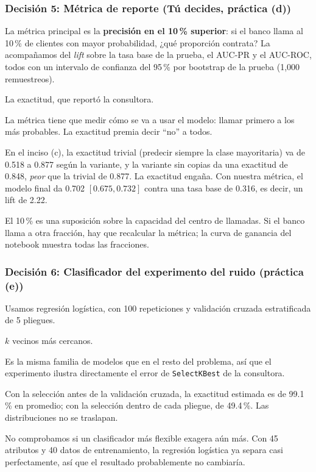 \documentclass[11pt, letterpaper]{article}
\begin{document}
\subsubsection*{Decisión 5: Métrica de reporte (Tú decides, práctica (d))}
\begin{description}[leftmargin=0pt, itemsep=2pt]
    \item[Decisión.] La métrica principal es la \textbf{precisión en el 10\,\% superior}: si el banco llama al 10\,\% de clientes con mayor probabilidad, ¿qué proporción contrata? La acompañamos del \emph{lift} sobre la tasa base de la prueba, el AUC-PR y el AUC-ROC, todos con un intervalo de confianza del 95\,\% por bootstrap de la prueba (1,000 remuestreos).
    \item[Alternativa descartada.] La exactitud, que reportó la consultora.
    \item[Por qué.] La métrica tiene que medir cómo se va a usar el modelo: llamar primero a los más probables. La exactitud premia decir ``no'' a todos.
    \item[Evidencia.] En el inciso (c), la exactitud trivial (predecir siempre la clase mayoritaria) va de 0.518 a 0.877 según la variante, y la variante sin copias da una exactitud de 0.848, \emph{peor} que la trivial de 0.877. La exactitud engaña. Con nuestra métrica, el modelo final da 0.702 $[0.675, 0.732]$ contra una tasa base de 0.316, es decir, un lift de 2.22.
    \item[Qué perdemos.] El 10\,\% es una suposición sobre la capacidad del centro de llamadas. Si el banco llama a otra fracción, hay que recalcular la métrica; la curva de ganancia del notebook muestra todas las fracciones.
\end{description}

\subsubsection*{Decisión 6: Clasificador del experimento del ruido (práctica (e))}
\begin{description}[leftmargin=0pt, itemsep=2pt]
    \item[Decisión.] Usamos regresión logística, con 100 repeticiones y validación cruzada estratificada de 5 pliegues.
    \item[Alternativa descartada.] $k$ vecinos más cercanos.
    \item[Por qué.] Es la misma familia de modelos que en el resto del problema, así que el experimento ilustra directamente el error de \texttt{SelectKBest} de la consultora.
    \item[Evidencia.] Con la selección antes de la validación cruzada, la exactitud estimada es de 99.1\,\% en promedio; con la selección dentro de cada pliegue, de 49.4\,\%. Las distribuciones no se traslapan.
    \item[Qué perdemos.] No comprobamos si un clasificador más flexible exagera aún más. Con 45 atributos y 40 datos de entrenamiento, la regresión logística ya separa casi perfectamente, así que el resultado probablemente no cambiaría.
\end{description}
\end{document}
